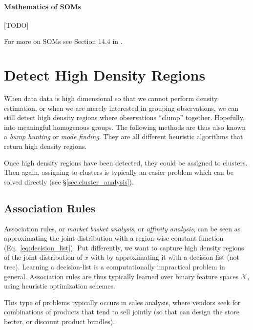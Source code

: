 \paragraph{Mathematics of SOMs}
[TODO]

For more on SOMs see Section 14.4 in \cite{hastie_elements_2003}. 









\section{Detect High Density Regions}
\label{sec:high_density}

When data data is high dimensional so that we cannot perform density estimation, or when we are merely interested in grouping observations, we can still detect high density regions where observations ``clump'' together. Hopefully, into meaningful homogenous groups.
The following methods are thus also known a \emph{bump hunting} or \emph{mode finding}.
They are all different heuristic algorithms that return high density regions. 

Once high density regions have been detected, they could be assigned to clusters. Then again, assigning to clusters is typically an easier problem which can be solved directly (see \S\ref{sec:cluster_analysis}).



\subsection{Association Rules}
\label{sec:association}
Association rules, or \emph{market basket analysis}, or \emph{affinity analysis}, can be seen as approximating the joint distribution with a region-wise constant function (Eq.~\ref{eq:decision_list}).
Put differently, we want to capture high density regions of the joint distribution of $x$ with by approximating it with a decision-list (not tree).
Learning a decision-list is a computationally impractical problem in general. Association rules are thus typically learned over binary feature spaces $\mathcal{X}$, using heuristic optimization schemes.

This type of problems typically occurs in sales analysis, where vendors seek for combinations of products that tend to sell jointly (so that can design the store better, or discount product bundles).

